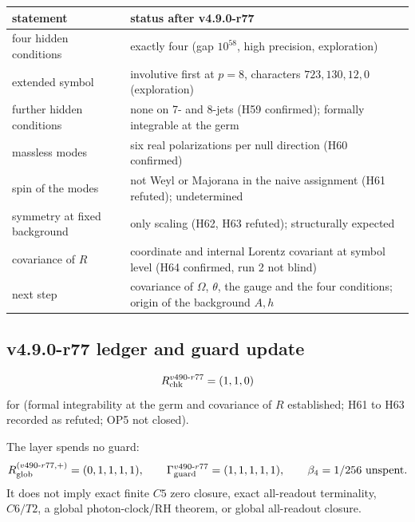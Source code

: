 \begin{center}
\small
\begin{tabular}{@{}>{\raggedright\arraybackslash}p{}>{\raggedright\arraybackslash}p{}@{}}
\toprule
statement & status after v4.9.0-r77\\
\midrule
four hidden conditions & exactly four (gap \(10^{58}\), high precision, exploration)\\
extended symbol & involutive first at \(p=8\), characters \(723,130,12,0\) (exploration)\\
further hidden conditions & none on 7- and 8-jets (H59 confirmed); formally integrable at the germ\\
massless modes & six real polarizations per null direction (H60 confirmed)\\
spin of the modes & not Weyl or Majorana in the naive assignment (H61 refuted); undetermined\\
symmetry at fixed background & only scaling (H62, H63 refuted); structurally expected\\
covariance of \(R\) & coordinate and internal Lorentz covariant at symbol level (H64 confirmed, run 2 not blind)\\
next step & covariance of \(\Omega\), \(\theta\), the gauge and the four conditions; origin of the background \(A,h\)\\
\bottomrule
\end{tabular}
\end{center}

\subsection*{v4.9.0-r77 ledger and guard update}
\label{subsec:v490-r77-ledger-guard}

\[
R_{\rm chk}^{v490\text{-}r77}=(1,1,0)
\]
for (formal integrability at the germ and covariance of \(R\) established; H61 to H63 recorded as refuted; OP5 not closed).

The layer spends no guard:
\[
R_{\rm glob}^{(v490\text{-}r77,+)}=(0,1,1,1,1),
\qquad
\Gamma_{\rm guard}^{v490\text{-}r77}=(1,1,1,1,1),
\qquad
\beta_4=1/256\ \text{unspent}.
\]
It does not imply exact finite \(C5\) zero closure, exact all-readout terminality,
\(C6/T2\), a global photon-clock/RH theorem, or global all-readout closure.
